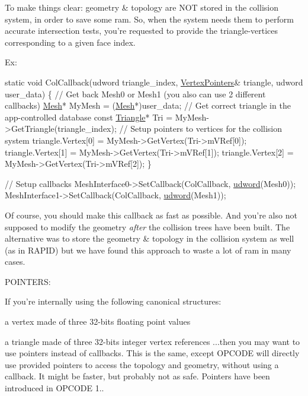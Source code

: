 To make things clear\+: geometry \& topology are N\+O\+T stored in the collision system, in order to save some ram. So, when the system needs them to perform accurate intersection tests, you're requested to provide the triangle-\/vertices corresponding to a given face index.

Ex\+:


\begin{DoxyCode}
\textcolor{keyword}{static} \textcolor{keywordtype}{void} ColCallback(udword triangle\_index, \hyperlink{struct_vertex_pointers}{VertexPointers}& triangle, udword user\_data)
\{
    \textcolor{comment}{// Get back Mesh0 or Mesh1 (you also can use 2 different callbacks)}
    \hyperlink{class_mesh}{Mesh}* MyMesh = (\hyperlink{class_mesh}{Mesh}*)user\_data;
    \textcolor{comment}{// Get correct triangle in the app-controlled database}
    \textcolor{keyword}{const} \hyperlink{class_triangle}{Triangle}* Tri = MyMesh->GetTriangle(triangle\_index);
    \textcolor{comment}{// Setup pointers to vertices for the collision system}
    triangle.Vertex[0] = MyMesh->GetVertex(Tri->mVRef[0]);
    triangle.Vertex[1] = MyMesh->GetVertex(Tri->mVRef[1]);
    triangle.Vertex[2] = MyMesh->GetVertex(Tri->mVRef[2]);
\}

\textcolor{comment}{// Setup callbacks}
MeshInterface0->SetCallback(ColCallback, \hyperlink{_ice_types_8h_a44c6f1920ba5551225fb534f9d1a1733}{udword}(Mesh0));
MeshInterface1->SetCallback(ColCallback, \hyperlink{_ice_types_8h_a44c6f1920ba5551225fb534f9d1a1733}{udword}(Mesh1));
\end{DoxyCode}


Of course, you should make this callback as fast as possible. And you're also not supposed to modify the geometry {\itshape after} the collision trees have been built. The alternative was to store the geometry \& topology in the collision system as well (as in R\+A\+P\+I\+D) but we have found this approach to waste a lot of ram in many cases.

P\+O\+I\+N\+T\+E\+R\+S\+:

If you're internally using the following canonical structures\+:
\begin{DoxyItemize}
\item a vertex made of three 32-\/bits floating point values
\item a triangle made of three 32-\/bits integer vertex references ...then you may want to use pointers instead of callbacks. This is the same, except O\+P\+C\+O\+D\+E will directly use provided pointers to access the topology and geometry, without using a callback. It might be faster, but probably not as safe. Pointers have been introduced in O\+P\+C\+O\+D\+E 1..
\end{DoxyItemize}


